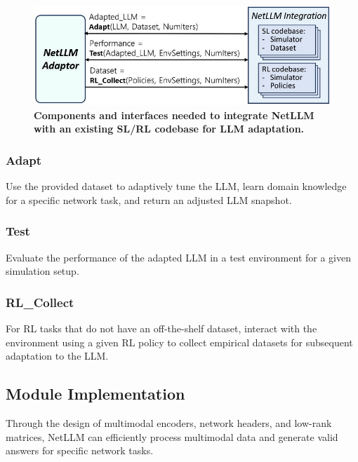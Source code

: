 \documentclass[twocolumn]{article}
\begin{document}
\begin{figure}[t]
  \centering
  \includegraphics[width=1\linewidth]{img/figure7.jpg}
  \caption{\textbf{Components and interfaces needed to integrate NetLLM with an existing SL/RL codebase for LLM adaptation.}}
  \label{fig:9}
\end{figure}

\subsubsection{Adapt}
Use the provided dataset to adaptively tune the LLM, learn domain knowledge for a specific network task, and return an adjusted LLM snapshot.

\subsubsection{Test}
Evaluate the performance of the adapted LLM in a test environment for a given simulation setup.

\subsubsection{RL\_Collect}
For RL tasks that do not have an off-the-shelf dataset, interact with the environment using a given RL policy to collect empirical datasets for subsequent adaptation to the LLM.

\subsection{Module Implementation}
Through the design of multimodal encoders, network headers, and low-rank matrices, NetLLM can efficiently process multimodal data and generate valid answers for specific network tasks.
\end{document}
